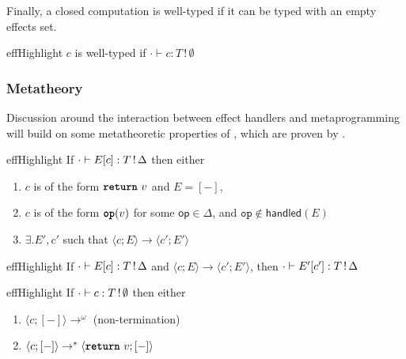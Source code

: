 Finally, a closed computation is well-typed if it can be typed with an empty effects set.  
\begin{definition}{effHighlight}
  $c$ is well-typed if $\cdot \vdash {c}: {T \, ! \, \emptyset}$
\end{definition}

\subsubsection{Metatheory}
Discussion around the interaction between effect handlers and metaprogramming will build on some metatheoretic properties of \efflang{}, which are proven by \citet{bauer-2014}.

\renewcommand{\effconfiguration}[2]{\langle {#1}; {#2} \rangle}
\renewcommand{\transition}[2]{#1 \rightarrow #2}

\begin{theorem}[Progress]{effHighlight}\label{thm:progress}
If $\cdot \vdash {E[c]}: {\effectType{T}}$ then either 
\begin{enumerate}
\item $c$ is of the form $\return{v}$ and $E = [-]$,
\item $c$ is of the form $\op{v}$ for some $\textsf{op} \in \Delta$, and $\texttt{op} \notin \textsf{handled}({E})$
\item $\exists. E', c'$ such that $\transition{\effconfiguration{c}{E}}{\effconfiguration{c'}{E'}}$
\end{enumerate}
\end{theorem}
\vspace{-\baselineskip}
\begin{theorem}[Preservation]{effHighlight}\label{thm:preservation}
If $\cdot \vdash {E[c]}: {\effectType{T}}$ and $\transition{\effconfiguration{c}{E}}{\effconfiguration{c'}{E'}}$, then $\cdot \vdash {E'[c']}: {\effectType{T}}$
\end{theorem}
\vspace{-\baselineskip}
\begin{corollary}{effHighlight}\label{thm:type-safety}
  If $\cdot \vdash {c}: {\effectType[\emptyset]{T}}$ then either 
\begin{enumerate}
\item $\langle c; [-] \rangle \to^{\omega}$ (non-termination)
\item $\langle c; [-] \rangle \to^{*} \langle \return{v}; [-] \rangle$
\end{enumerate}
\end{corollary}

